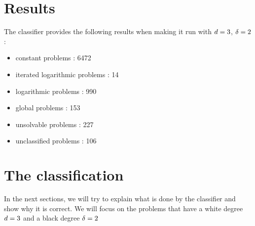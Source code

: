 \section{Results}
The classifier provides the following results when making it run with $d = 3$, $\delta = 2$ :
\begin{itemize}
    \item constant problems : 6472
    \item iterated logarithmic problems : 14
    \item logarithmic problems : 990
    \item global problems : 153
    \item unsolvable problems : 227
    \item unclassified problems : 106
\end{itemize}

\section{The classification}
In the next sections, we will try to explain what is done by the classifier and show why it is correct. We will focus on the problems that have a white degree $d = 3$ and a black degree $\delta = 2$